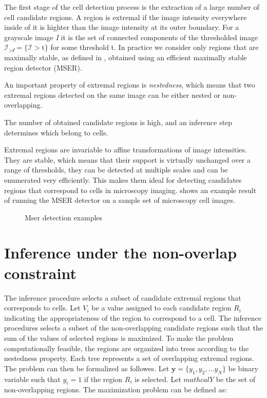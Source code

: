 	The first stage of the cell detection process is the extraction of a large number of cell candidate regions. A region is extremal  if the image intensity everywhere inside of it is highter than the image intensity at its outer boundary. For a grayscale image \textit{I} it is the set of connected components of the thresholded image $\mathcal{I_{>\text{t}}} = \{\mathcal{I} > \text{t}\}$ for some threshold t. In practice we consider only regions that are maximally stable, as defined in \cite{matas04}, obtained using an efficient maximally stable region detector (MSER).
	
	An important property of extremal regions is \textit{nestedness}, which means that two extremal regions detected on the same image can be either nested or non-overlapping.
	
	The number of obtained candidate regions is high, and an inference step determines which belong to cells.
	
	Extremal regions are invariable to affine transformations of image intensities. They are stable, which means that their support is virtually unchanged over a range of thresholds, they can be detected at multiple scales and can be enumerated very efficiently. This makes them ideal for detecting candidates regions that correspond to cells in microscopy imaging.  shows an example result of running the MSER detector on a sample set of microscopy cell images.
	
	\begin{figure}[h]
		\centering
		\caption{Mser detection examples}
		\label{fig:mserexamplesoncells}
	\end{figure}
	
	\section{Inference under the non-overlap constraint \statusfirstdraft}
	\label{sec:detector_inference}
	
	The inference procedure selects a subset of candidate extremal regions that corresponds to cells. Let $V_i$ be a value assigned to each candidate region $R_i$ indicating the appropriateness of the region to correspond to a cell. The inference procedures selects a subset of the non-overlapping candidate regions such that the sum of the values of selected regions is maximized. To make the problem computationally feasible, the regions are organized into tress according to the nestedness property. Each tree represents a set of overlapping extremal regions. The problem can then be formalized as followes. Let $\textbf{y} = \{y_1, y_2, \dots y_N\}$ be binary variable such that $y_i = 1$ if the region $R_i$ is selected. Let $mathcal{Y}$ be the set of non-overlapping regions. The maximization problem can be defined as:
	
